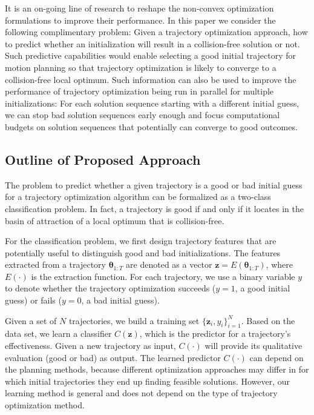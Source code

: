\documentclass[letterpaper, 10 pt, conference]{ieeeconf}  %
\newcommand{\btheta}{\mbox{$\bm \theta$}}
\newcommand{\fsym}{\mbox{$\mathbf z$}}
\begin{document}
It is an on-going line of research to reshape the non-convex optimization formulations to improve their performance. In this paper we consider the following complimentary problem: Given a trajectory optimization approach, how to predict whether an initialization will result in a collision-free solution or not. 
Such predictive capabilities would enable selecting a good initial trajectory for motion planning so that trajectory optimization is likely to converge to a collision-free local optimum. Such information can also be used to improve the performance of trajectory optimization being run in parallel for multiple initializations: For each solution sequence starting with a different initial guess, we can stop bad solution sequences early enough and focus computational budgets on solution sequences that potentially can converge to good outcomes.


\subsection{Outline of Proposed Approach}
The problem to predict whether a given trajectory is a good or bad initial guess for a trajectory optimization algorithm can be formalized as a two-class classification problem. In fact, a trajectory is good if and only if it locates in the basin of attraction of a local optimum that is collision-free.

For the classification problem, we first design trajectory features that are potentially useful to distinguish good and bad initializations. The features extracted from a trajectory $\btheta_{1:T}$ are denoted as a vector $\fsym = E(\btheta_{1:T})$, where $E(\cdot)$ is the extraction function. For each trajectory, we use a binary variable $y$ to denote whether the trajectory optimization succeeds ($y = 1$, a good initial guess) or fails ($y = 0$, a bad initial guess). 


Given a set of $N$ trajectories, we build a training set $\{\fsym_i, y_i\}_{i=1}^N$. Based on the data set, we learn a classifier $C(\fsym) $, which is the predictor for a trajectory's effectiveness. Given a new trajectory as input, $C(\cdot)$ will provide its qualitative evaluation (good or bad) as output. The learned predictor $C(\cdot)$ can depend on the planning methods, because different optimization approaches may differ in for which initial trajectories they end up finding feasible solutions.  However, our learning method is general and does not depend on the type of trajectory optimization method.
\end{document}
